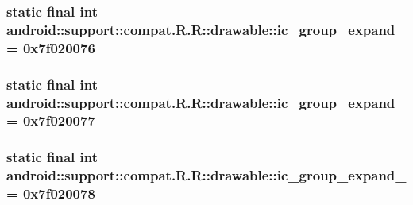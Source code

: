 \hypertarget{classandroid_1_1support_1_1compat_1_1_r_1_1drawable_8853502ab3e405a63d2167628508eaaf}{
\subsubsection[{ic\_\-group\_\-expand\_\-07}]{\setlength{\rightskip}{0pt plus 5cm}static final int android::support::compat.R.R::drawable::ic\_\-group\_\-expand\_ = 0x7f020076}}
\label{classandroid_1_1support_1_1compat_1_1_r_1_1drawable_8853502ab3e405a63d2167628508eaaf}


\hypertarget{classandroid_1_1support_1_1compat_1_1_r_1_1drawable_9deb696a35ae4d2eccd20739be14bbbb}{
\subsubsection[{ic\_\-group\_\-expand\_\-08}]{\setlength{\rightskip}{0pt plus 5cm}static final int android::support::compat.R.R::drawable::ic\_\-group\_\-expand\_ = 0x7f020077}}
\label{classandroid_1_1support_1_1compat_1_1_r_1_1drawable_9deb696a35ae4d2eccd20739be14bbbb}


\hypertarget{classandroid_1_1support_1_1compat_1_1_r_1_1drawable_2c11a2ddbcc78fc79cf07a1fc0a750c3}{
\subsubsection[{ic\_\-group\_\-expand\_\-09}]{\setlength{\rightskip}{0pt plus 5cm}static final int android::support::compat.R.R::drawable::ic\_\-group\_\-expand\_ = 0x7f020078}}
\label{classandroid_1_1support_1_1compat_1_1_r_1_1drawable_2c11a2ddbcc78fc79cf07a1fc0a750c3}



